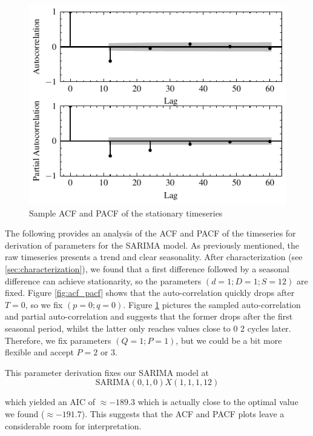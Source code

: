 \documentclass[conference]{IEEEtran}
\begin{document}
\begin{figure}[hbtp]
    \centering
    \includegraphics{../figs/sacf_spacf.pdf}
    \caption{Sample ACF and PACF of the stationary timeseries}
    \label{fig:sacf_spacf}
\end{figure}

The following provides an analysis of the ACF and PACF of the timeseries for derivation of parameters for the SARIMA model. As previously mentioned, the raw timeseries presents a trend and clear seasonality. After characterization (see \ref{sec:characterization}), we found that a first difference followed by a seasonal difference can achieve stationarity, so the parameters $(d=1;D=1;S=12)$ are fixed. Figure \ref{fig:acf_pacf} shows that the auto-correlation quickly drops after $T=0$, so we fix $(p=0;q=0)$. Figure \ref{fig:sacf_spacf} pictures the sampled auto-correlation and partial auto-correlation and suggests that the former drops after the first seasonal period, whilst the latter only reaches values close to $0$ 2 cycles later. Therefore, we fix parameters $(Q=1;P=1)$, but we could be a bit more flexible and accept $P=2$ or $3$.

This parameter derivation fixes our SARIMA model at
\[
    \text{SARIMA}(0,1,0)X(1,1,1,12)
\]

which yielded an AIC of $\approx -189.3$ which is actually close to the optimal value we found ($\approx -191.7$). This suggests that the ACF and PACF plots leave a considerable room for interpretation.
\end{document}

